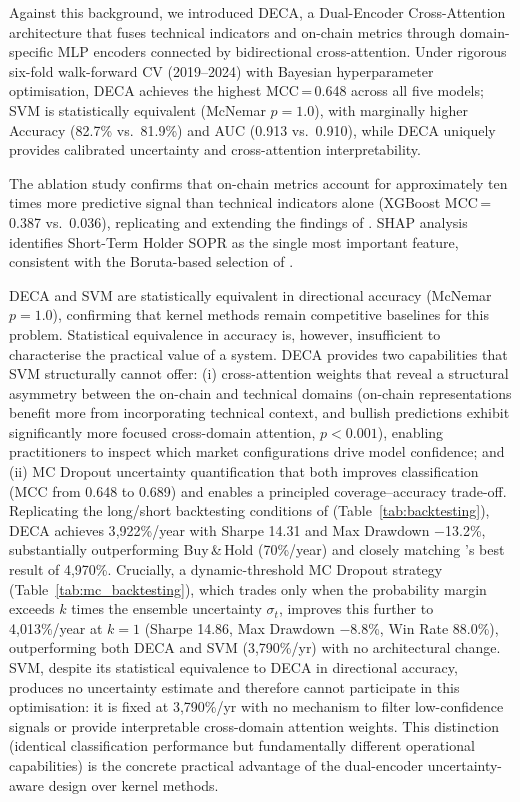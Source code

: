 \documentclass[final,3p,times,authoryear]{elsarticle}
\begin{document}
Against this background, we introduced DECA, a Dual-Encoder
Cross-Attention architecture that fuses technical indicators and on-chain
metrics through domain-specific MLP encoders connected by bidirectional
cross-attention.
Under rigorous six-fold walk-forward CV (2019--2024) with Bayesian
hyperparameter optimisation, DECA achieves the highest MCC\,=\,0.648
across all five models; SVM is statistically equivalent (McNemar $p=1.0$),
with marginally higher Accuracy (82.7\% vs.\ 81.9\%) and AUC (0.913
vs.\ 0.910), while DECA uniquely provides calibrated uncertainty
and cross-attention interpretability.

The ablation study confirms that on-chain metrics account for
approximately ten times more predictive signal than technical indicators
alone (XGBoost MCC\,=\,0.387 vs.\ 0.036), replicating and extending
the findings of \citet{omole2025eaai}.
SHAP analysis identifies Short-Term Holder SOPR as the single most
important feature, consistent with the Boruta-based selection of
\citet{omole2024financial}.

DECA and SVM are statistically equivalent in directional accuracy
(McNemar $p = 1.0$), confirming that kernel methods remain competitive
baselines for this problem.
Statistical equivalence in accuracy is, however, insufficient to
characterise the practical value of a system.
DECA provides two capabilities that SVM structurally cannot offer:
(i) cross-attention weights that reveal a structural asymmetry between
the on-chain and technical domains (on-chain representations benefit
more from incorporating technical context, and bullish predictions
exhibit significantly more focused cross-domain attention, $p < 0.001$),
enabling practitioners to inspect which market configurations drive
model confidence;
and (ii) MC Dropout uncertainty quantification that both improves
classification (MCC from 0.648 to 0.689) and enables a principled
coverage--accuracy trade-off.
Replicating the long/short backtesting conditions of
\citet{omole2025eaai} (Table~\ref{tab:backtesting}), DECA achieves
3{,}922\%/year with Sharpe 14.31 and Max Drawdown $-$13.2\%,
substantially outperforming Buy\,\&\,Hold (70\%/year) and closely
matching \citeauthor{omole2025eaai}'s best result of 4{,}970\%.
Crucially, a dynamic-threshold MC Dropout strategy
(Table~\ref{tab:mc_backtesting}), which trades only when the
probability margin exceeds $k$ times the ensemble uncertainty
$\sigma_t$, improves this further to 4{,}013\%/year at $k=1$
(Sharpe 14.86, Max Drawdown $-$8.8\%, Win Rate 88.0\%), outperforming
both DECA and SVM (3{,}790\%/yr) with no architectural change.
SVM, despite its statistical equivalence to DECA in directional
accuracy, produces no uncertainty estimate and therefore cannot
participate in this optimisation: it is fixed at 3{,}790\%/yr with
no mechanism to filter low-confidence signals or provide
interpretable cross-domain attention weights.
This distinction (identical classification performance but
fundamentally different operational capabilities) is the concrete
practical advantage of the dual-encoder uncertainty-aware design
over kernel methods.
\end{document}
